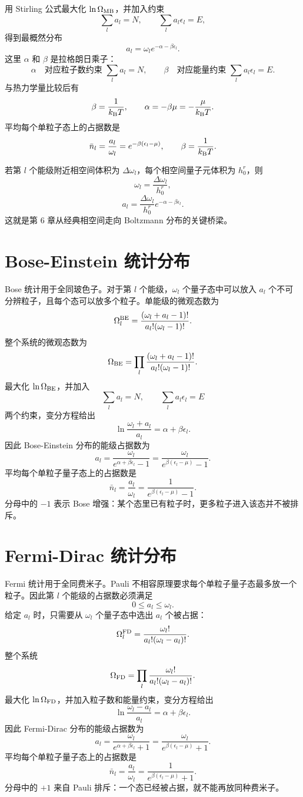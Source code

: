 用 Stirling 公式最大化 $\ln\Omega_{\rm MB}$，并加入约束
\[
  \sum_l a_l=N,\qquad
  \sum_l a_l\epsilon_l=E,
\]
得到最概然分布
\[
  a_l=\omega_l e^{-\alpha-\beta\epsilon_l}.
\]
这里 $\alpha$ 和 $\beta$ 是拉格朗日乘子：
\[
  \alpha\quad\text{对应粒子数约束 } \sum_l a_l=N,
\qquad
  \beta\quad\text{对应能量约束 } \sum_l a_l\epsilon_l=E.
\]
与热力学量比较后有
\[
  \beta=\frac{1}{k_{\mathrm B} T},\qquad
  \alpha=-\beta\mu=-\frac{\mu}{k_{\mathrm B} T}.
\]
平均每个单粒子态上的占据数是
\[
  \bar n_l=\frac{a_l}{\omega_l}
  =e^{-\beta(\epsilon_l-\mu)},
\qquad
  \beta=\frac{1}{k_{\mathrm B} T}.
\]

若第 $l$ 个能级附近相空间体积为 $\Delta\omega_l$，每个相空间量子元体积为 $h_0^r$，则
\[
  \omega_l=\frac{\Delta\omega_l}{h_0^r},
\]
\[
  a_l=\frac{\Delta\omega_l}{h_0^r}e^{-\alpha-\beta\epsilon_l}.
\]
这就是第 6 章从经典相空间走向 Boltzmann 分布的关键桥梁。

\section{Bose-Einstein 统计分布}

Bose 统计用于全同玻色子。对于第 $l$ 个能级，$\omega_l$ 个量子态中可以放入 $a_l$ 个不可分辨粒子，且每个态可以放多个粒子。单能级的微观态数为
\[
  \Omega_l^{\rm BE}
  =\frac{(\omega_l+a_l-1)!}{a_l!(\omega_l-1)!}.
\]
整个系统的微观态数为
\[
  \Omega_{\rm BE}
  =\prod_l
  \frac{(\omega_l+a_l-1)!}{a_l!(\omega_l-1)!}.
\]
最大化 $\ln\Omega_{\rm BE}$，并加入
\[
  \sum_l a_l=N,\qquad \sum_l a_l\epsilon_l=E
\]
两个约束，变分方程给出
\[
  \ln\frac{\omega_l+a_l}{a_l}
  =\alpha+\beta\epsilon_l.
\]
因此 Bose-Einstein 分布的能级占据数为
\[
  a_l
  =
  \frac{\omega_l}{e^{\alpha+\beta\epsilon_l}-1}
  =
  \frac{\omega_l}{e^{\beta(\epsilon_l-\mu)}-1}.
\]
平均每个单粒子量子态上的占据数是
\[
  \bar n_l
  =\frac{a_l}{\omega_l}
  =\frac{1}{e^{\beta(\epsilon_l-\mu)}-1}.
\]
分母中的 $-1$ 表示 Bose 增强：某个态里已有粒子时，更多粒子进入该态并不被排斥。

\section{Fermi-Dirac 统计分布}

Fermi 统计用于全同费米子。Pauli 不相容原理要求每个单粒子量子态最多放一个粒子。因此第 $l$ 个能级的占据数必须满足
\[
  0\le a_l\le \omega_l.
\]
给定 $a_l$ 时，只需要从 $\omega_l$ 个量子态中选出 $a_l$ 个被占据：
\[
  \Omega_l^{\rm FD}
  =\frac{\omega_l!}{a_l!(\omega_l-a_l)!}.
\]
整个系统
\[
  \Omega_{\rm FD}
  =\prod_l
  \frac{\omega_l!}{a_l!(\omega_l-a_l)!}.
\]
最大化 $\ln\Omega_{\rm FD}$，并加入粒子数和能量约束，变分方程给出
\[
  \ln\frac{\omega_l-a_l}{a_l}
  =\alpha+\beta\epsilon_l.
\]
因此 Fermi-Dirac 分布的能级占据数为
\[
  a_l
  =
  \frac{\omega_l}{e^{\alpha+\beta\epsilon_l}+1}
  =
  \frac{\omega_l}{e^{\beta(\epsilon_l-\mu)}+1}.
\]
平均每个单粒子量子态上的占据数是
\[
  \bar n_l
  =\frac{a_l}{\omega_l}
  =\frac{1}{e^{\beta(\epsilon_l-\mu)}+1}.
\]
分母中的 $+1$ 来自 Pauli 排斥：一个态已经被占据，就不能再放同种费米子。

